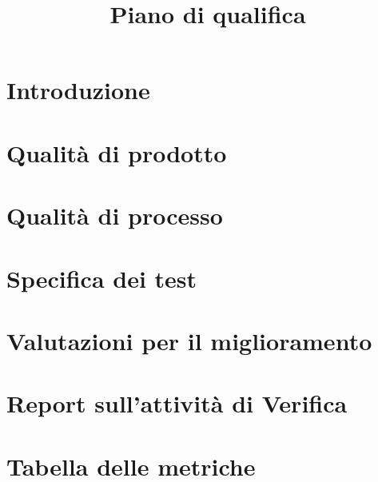 \documentclass{article}
\title{Piano di qualifica}
\begin{document}


\newpage
\section{Introduzione}%
\label{sec:introduzione}



\newpage
\section{Qualità di prodotto}%
\label{sec:qualita_di_prodotto}



\newpage
\section{Qualità di processo}%
\label{sec:qualita_di_processo}



\newpage
\section{Specifica dei test}%
\label{sub:specifica_test}



\newpage
\section{Valutazioni per il miglioramento}%
\label{sec:valutazioni_miglioramento}




\newpage
\section{Report sull'attività di Verifica}%
\label{sec:report_verifica}



\newpage
\section{Tabella delle metriche}%
\label{sec:tabella_metriche}



\end{document}
